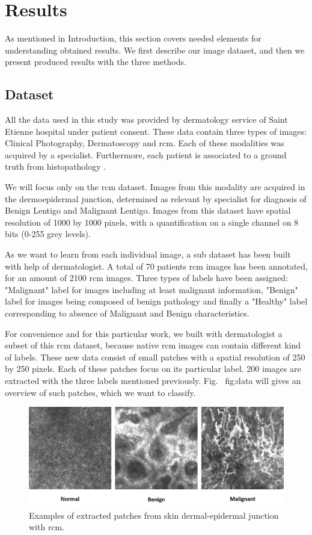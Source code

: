 \section{Results}
\label{sec:results}
As mentioned in Introduction, this section covers needed elements for understanding obtained results. We first describe our image dataset, and then we present produced results with the three methods.\par
\subsection{Dataset}
\label{sec:resulst:dataset}
All the data used in this study was provided by dermatology service of Saint Etienne hospital under patient consent. These data contain three types of images: Clinical Photography, Dermatoscopy and \ac{rcm}. Each of these modalities was acquired by a specialist. Furthermore, each patient is associated to a ground truth from histopathology \cite{Cinotti2018}.\par
We will focus only on the \ac{rcm} dataset. Images from this modality are acquired in the dermoepidermal junction, determined as relevant by specialist for diagnosis of Benign Lentigo and Malignant Lentigo. Images from this dataset have spatial resolution of 1000 by 1000 pixels, with a quantification on a single channel on 8 bits (0-255 grey levels).\par
As we want to learn from each individual image, a sub dataset has been built with help of dermatologist. A total of 70 patients \ac{rcm} images has been annotated, for an amount of 2100 \ac{rcm} images. Three types of labels have been assigned: "Malignant" label for images including at least malignant information, "Benign" label for images being composed of benign pathology and finally a "Healthy" label corresponding to absence of Malignant and Benign characteristics.\par
For convenience and for this particular work, we built with dermatologist a subset of this \ac{rcm} dataset, because native \ac{rcm} images can contain different kind of labels. These new data consist of small patches with a spatial resolution of 250 by 250 pixels. Each of these patches focus on its particular label. 200 images are extracted with the three labels mentioned previously. Fig. \ {fig:data} will gives an overview of such patches, which we want to classify.\par
\begin{figure}[h]
\centering
    \includegraphics[width=\linewidth]{content/figures/Data.png}
    \caption{Examples of extracted patches from skin dermal-epidermal junction with \ac{rcm}.}
    \label{fig:data}
\end{figure}
